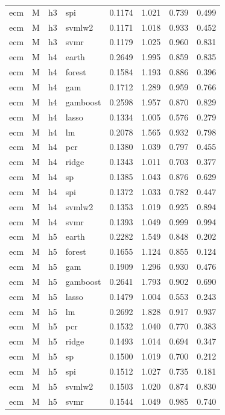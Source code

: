 \begin{ThreePartTable}
\begin{longtable}[t]{llclcccc}
ecm & M & h3 & spi & 0.1174 & 1.021 & 0.739 & 0.499\\
ecm & M & h3 & svmlw2 & 0.1171 & 1.018 & 0.933 & 0.452\\
ecm & M & h3 & svmr & 0.1179 & 1.025 & 0.960 & 0.831\\
\addlinespace
ecm & M & h4 & earth & 0.2649 & 1.995 & 0.859 & 0.835\\
ecm & M & h4 & forest & 0.1584 & 1.193 & 0.886 & 0.396\\
ecm & M & h4 & gam & 0.1712 & 1.289 & 0.959 & 0.766\\
ecm & M & h4 & gamboost & 0.2598 & 1.957 & 0.870 & 0.829\\
ecm & M & h4 & lasso & 0.1334 & 1.005 & 0.576 & 0.279\\
ecm & M & h4 & lm & 0.2078 & 1.565 & 0.932 & 0.798\\
ecm & M & h4 & pcr & 0.1380 & 1.039 & 0.797 & 0.455\\
ecm & M & h4 & ridge & 0.1343 & 1.011 & 0.703 & 0.377\\
ecm & M & h4 & sp & 0.1385 & 1.043 & 0.876 & 0.629\\
ecm & M & h4 & spi & 0.1372 & 1.033 & 0.782 & 0.447\\
ecm & M & h4 & svmlw2 & 0.1353 & 1.019 & 0.925 & 0.894\\
ecm & M & h4 & svmr & 0.1393 & 1.049 & 0.999 & 0.994\\
\addlinespace
ecm & M & h5 & earth & 0.2282 & 1.549 & 0.848 & 0.202\\
ecm & M & h5 & forest & 0.1655 & 1.124 & 0.855 & 0.124\\
ecm & M & h5 & gam & 0.1909 & 1.296 & 0.930 & 0.476\\
ecm & M & h5 & gamboost & 0.2641 & 1.793 & 0.902 & 0.690\\
ecm & M & h5 & lasso & 0.1479 & 1.004 & 0.553 & 0.243\\
ecm & M & h5 & lm & 0.2692 & 1.828 & 0.917 & 0.937\\
ecm & M & h5 & pcr & 0.1532 & 1.040 & 0.770 & 0.383\\
ecm & M & h5 & ridge & 0.1493 & 1.014 & 0.694 & 0.347\\
ecm & M & h5 & sp & 0.1500 & 1.019 & 0.700 & 0.212\\
ecm & M & h5 & spi & 0.1512 & 1.027 & 0.735 & 0.181\\
ecm & M & h5 & svmlw2 & 0.1503 & 1.020 & 0.874 & 0.830\\
ecm & M & h5 & svmr & 0.1544 & 1.049 & 0.985 & 0.740\\

\end{longtable}
\end{ThreePartTable}
